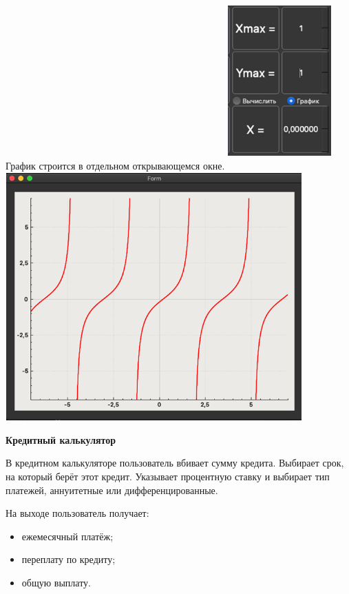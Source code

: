 \documentclass[]{article}
\begin{document}
График строится в отдельном открывающемся окне.
\includegraphics[width=1.56250in,height=2.70000in]{media/image2.png}
\includegraphics[width=4.49653in,height=3.74444in]{media/image3.png}

\pagebreak[25]

\huge
\textbf{Кредитный калькулятор}
\newline

\LARGE
В кредитном калькуляторе пользователь вбивает сумму кредита. Выбирает
срок, на который берёт этот кредит. Указывает процентную ставку и
выбирает тип платежей, аннуитетные или дифференцированные.

На выходе пользователь получает:

\begin{itemize}
\item
  ежемесячный платёж;
\item
  переплату по кредиту;
\item
  общую выплату.
\end{itemize}
\end{document}
